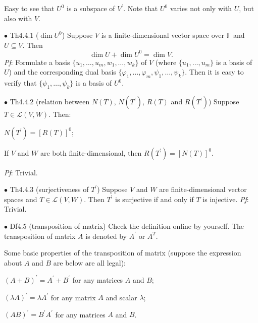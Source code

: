 \documentclass{article}
\begin{document}
\begin{Rmk}{}
    Easy to see that \textcolor{Th}{$U^0$ is a subspace of $V^\prime$.} Note that $U^0$ varies not only with $U$, but also with $V$.
\end{Rmk}

\begin{Th}{$\bullet$ Th4.4.1 ($\dim U^0$)}
    Suppose $V$ is a finite-dimensional vector space over $\mathbb{F}$ and $U\subseteq V$. Then
    $$\dim U + \dim U^0 = \dim V.$$
    \tcblower
    \textit{Pf}: Formulate a basis $\{u_1, \dots, u_m, w_1, \dots, w_k\}$ of $V$ (where $\{u_1, \dots, u_m\}$ is a basis of $U$) and the corresponding dual basis $\{\varphi_1, ..., \varphi_m, \psi_1, \dots, \psi_k\}$. Then it is easy to verify that $\{\psi_1, \dots, \psi_k\}$ is a basis of $U^0$. 
\end{Th}

\begin{Th}{$\bullet$ Th4.4.2 (relation between $N(T)$, $N(T^\prime)$, $R(T)$ and $R(T^\prime)$)}
    Suppose $T\in\mathcal{L}(V, W)$. Then:
    \begin{compactenum}
        \item $N(T^\prime) = [R(T)]^0$;
        \item If $V$ and $W$ are both finite-dimensional, then $R(T^\prime) = [N(T)]^0$.
    \end{compactenum}
    \tcblower
    \textit{Pf}: Trivial.
\end{Th}

\begin{Th}{$\bullet$ Th4.4.3 (surjectiveness of $T^\prime$)}
    Suppose $V$ and $W$ are finite-dimensional vector spaces and $T\in\mathcal{L}(V, W)$. Then $T^\prime$ is surjective if and only if $T$ is injective.
    \tcblower
    \textit{Pf}: Trivial.
\end{Th}

\begin{Df}{$\bullet$ Df4.5 (transposition of matrix)}
    Check the definition online by yourself. The transposition of matrix $A$ is denoted by $A^\prime$ or $A^T$.
\end{Df}

\begin{Rmk}{}
    \textcolor{Th}{Some basic properties of the transposition of matrix (suppose the expression about $A$ and $B$ are below are all legal):
    \begin{compactenum}
        \item $(A+B)^\prime = A^\prime + B^\prime$ for any matrices $A$ and $B$;
        \item $(\lambda A)^\prime = \lambda A^\prime$ for any matrix $A$ and scalar $\lambda$;
        \item $(AB)^\prime = B^\prime A^\prime$ for any matrices $A$ and $B$.
    \end{compactenum}}
\end{Rmk}
\end{document}
